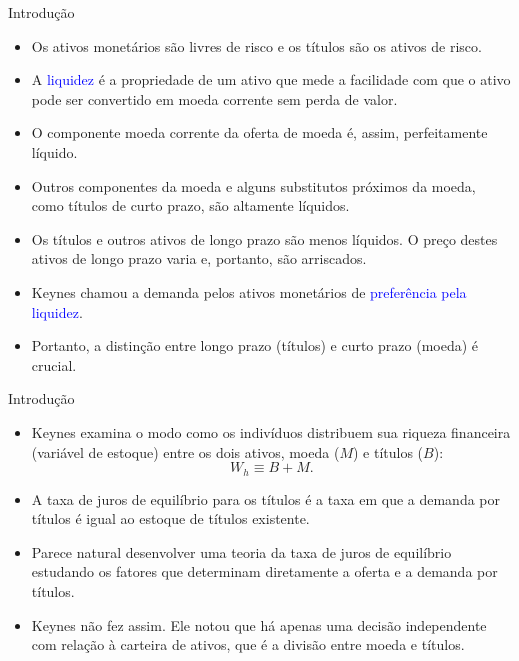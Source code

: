 \documentclass[10pt]{beamer}
\begin{document}
\begin{frame}{Introdução}
\begin{itemize}
    \item Os ativos monetários são livres de risco e os títulos são os ativos de risco.
    \bigskip
    \item A \textcolor{blue}{liquidez} é a propriedade de um ativo que mede a facilidade com que o ativo pode ser convertido em moeda corrente sem perda de valor.
    \bigskip
    \item O componente moeda corrente da oferta de moeda é, assim, perfeitamente líquido.
    \bigskip
    \item Outros componentes da moeda e alguns substitutos próximos da moeda, como títulos de curto prazo, são altamente líquidos.
    \bigskip
    \item Os títulos e outros ativos de longo prazo são menos líquidos. O preço destes ativos de longo prazo varia e, portanto, são arriscados.
    \bigskip
    \item Keynes chamou a demanda pelos ativos monetários de \textcolor{blue}{preferência pela liquidez}.
    \bigskip
    \item Portanto, a distinção entre longo prazo (títulos) e curto prazo (moeda) é crucial.
\end{itemize}
\end{frame}

\begin{frame}{Introdução}
\begin{itemize}
    \item Keynes examina o modo como os indivíduos distribuem sua riqueza financeira (variável de estoque) entre os dois ativos, moeda ($M$) e títulos ($B$):
    \[
    W_h \equiv B + M.
    \]
    \bigskip
    \item A taxa de juros de equilíbrio para os títulos é a taxa em que a demanda por títulos é igual ao estoque de títulos existente.
    \bigskip
    \item Parece natural desenvolver uma teoria da taxa de juros de equilíbrio estudando os fatores que determinam diretamente a oferta e a demanda por títulos.
    \bigskip
    \item Keynes não fez assim. Ele notou que há apenas uma decisão independente com relação à carteira de ativos, que é a divisão entre moeda e títulos.
\end{itemize}
\end{frame}
\end{document}
